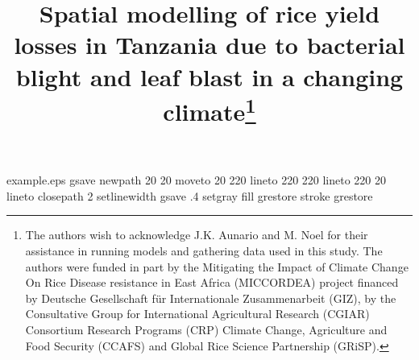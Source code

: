 %
%
%
%
%
\begin{filecontents*}{example.eps}
gsave
newpath
  20 20 moveto
  20 220 lineto
  220 220 lineto
  220 20 lineto
closepath
2 setlinewidth
gsave
  .4 setgray fill
grestore
stroke
grestore
\end{filecontents*}
%
\RequirePackage{fix-cm}
%
\documentclass[smallcondensed,natbib]{svjour3}     %
%
\smartqed  %
%
\usepackage{graphicx}
%
\usepackage{mathptmx}      %
%
\usepackage{latexsym}
%
%
%


\title{Spatial modelling of rice yield losses in Tanzania due to bacterial blight and leaf blast in a changing climate\thanks{The authors wish to acknowledge J.K. Aunario and M. Noel for their assistance in running models and gathering data used in this study. The authors were funded in part by the Mitigating the Impact of Climate Change On Rice Disease resistance in East Africa (MICCORDEA) project financed by Deutsche Gesellschaft f{\"u}r Internationale Zusammenarbeit (GIZ), by the Consultative Group for International Agricultural Research (CGIAR) Consortium Research Programs (CRP) Climate Change, Agriculture and Food Security (CCAFS) and Global Rice Science Partnership (GRiSP).}}


